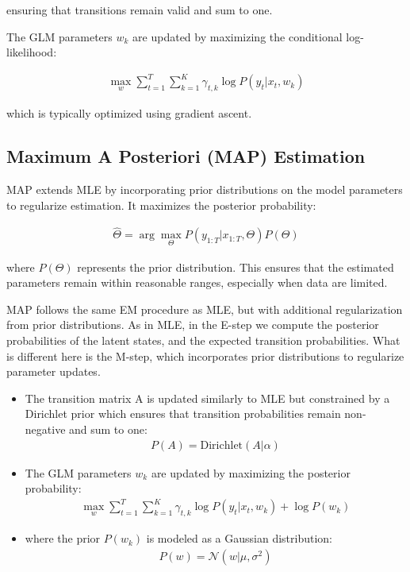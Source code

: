 ensuring that transitions remain valid and sum to one.

The GLM parameters \( w_k \) are updated by maximizing the conditional log-likelihood:

\begin{align}
\max_w \sum_{t=1}^{T} \sum_{k=1}^{K} \gamma_{t,k} \log P(y_t | x_t, w_k)
\end{align}

which is typically optimized using gradient ascent.

\subsection{Maximum A Posteriori (MAP) Estimation} 


MAP extends MLE by incorporating prior distributions on the model parameters to regularize estimation. It maximizes the posterior probability:

\begin{align}
\hat{\Theta} = \arg\max_{\Theta} P(y_{1:T} | x_{1:T}, \Theta) P(\Theta)
\end{align}

where \( P(\Theta) \) represents the prior distribution. This ensures that the estimated parameters remain within reasonable ranges, especially when data are limited.

MAP follows the same EM procedure as MLE, but with additional regularization from prior distributions. 
As in MLE,  in the E-step we compute the posterior probabilities of the latent states, and the expected transition probabilities. What is different here is the M-step, which incorporates prior distributions to regularize parameter updates. 

\begin{itemize}
    \item The transition matrix A is updated similarly to MLE but constrained by a Dirichlet prior which ensures that transition probabilities remain non-negative and sum to one:
    \begin{align}
    P(A) = \text{Dirichlet}(A | \alpha)
    \end{align}
    \item The GLM parameters \( w_{k}\) are updated by maximizing the posterior probability: 
\begin{align}
\max_w \sum_{t=1}^{T} \sum_{k=1}^{K} \gamma_{t,k} \log P(y_t | x_t, w_k)+\log P(w_k)
\end{align} 
\item where the prior $P(w_{k})$ is modeled as a Gaussian distribution:
    \begin{align}
    P(w) = \mathcal{N}(w | \mu, \sigma^2)
    \end{align}
\end{itemize}

